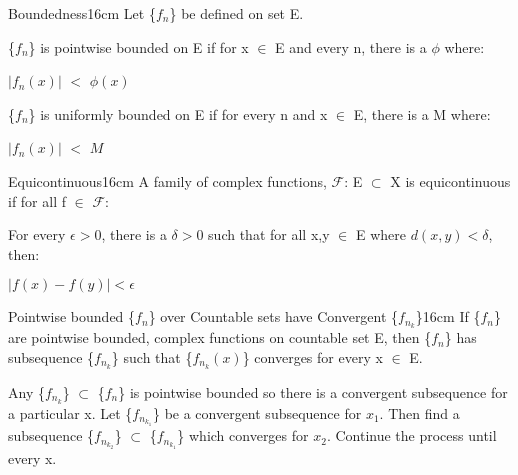     \begin{definition}{Boundedness}{16cm}
        Let \{$f_n$\} be defined on set E.

        \{$f_n$\} is {\color{lblue} pointwise bounded} on E if for x $\in$ E
        and every n, there is a $\phi$ where:

        \hspace{0.5cm}
        $|f_n(x)|$ $<$ $\phi(x)$

        \{$f_n$\} is {\color{lblue} uniformly bounded} on E if for every n
        and x $\in$ E, there is a M where:

        \hspace{0.5cm}
        $|f_n(x)|$ $<$ $M$
    \end{definition}

    \vspace{0.5cm}



    \begin{definition}{Equicontinuous}{16cm}
        A family of complex functions, $\mathscr{F}$: E $\subset$ X
        is {\color{lblue} equicontinuous} if for all f $\in$ $\mathscr{F}$:
        
        \hspace{0.5cm}
        For every $\epsilon > 0$, there is a $\delta > 0$ such that for all
        x,y $\in$ E where $d(x,y) < \delta$, then:
        
        \hspace{1cm}
        $|f(x) - f(y)| < \epsilon$
    \end{definition}

    \vspace{0.5cm}



    \begin{wtheorem}{Pointwise bounded \{$f_n$\} over Countable sets have
    Convergent \{$f_{n_k}$\}}{16cm}
        If \{$f_n$\} are pointwise bounded, complex functions on countable set E,
        then \{$f_n$\} has subsequence \{$f_{n_k}$\} such that
        \{$f_{n_k}(x)$\} converges for every x $\in$ E.
    \end{wtheorem}

    \begin{intuition}
        Any \{$f_{n_k}$\} $\subset$ \{$f_n$\} is pointwise bounded
        so there is a convergent subsequence for a particular x.
        Let \{$f_{n_{k_1}}$\} be a convergent subsequence for $x_1$.
        Then find a subsequence \{$f_{n_{k_2}}$\} $\subset$ \{$f_{n_{k_1}}$\}
        which converges for $x_2$. Continue the process until every x.
    \end{intuition}

